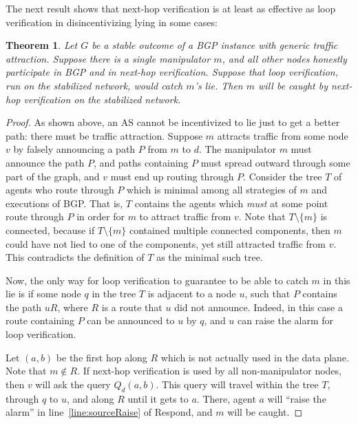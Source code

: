 \documentclass[10pt]{article}
\newtheorem{theorem}{Theorem}
\begin{document}
  The next result shows that next-hop verification is at least as
  effective as loop verification in disincentivizing lying in some cases:
  \begin{theorem}
    Let $G$ be a stable outcome of a BGP instance with generic traffic attraction.
    Suppose there is a single manipulator $m$,
    and all other nodes honestly participate in BGP and in next-hop verification.
    Suppose that loop verification, run on the stabilized network,
    would catch $m$'s lie.
    Then $m$ will be caught by next-hop verification on the stabilized network.
  \end{theorem}
  \begin{proof}
    As shown above, an AS cannot be incentivized to lie just to get a better
    path: there must be traffic attraction.
    Suppose $m$ attracts traffic from some node $v$ by falsely announcing a path
    $P$ from $m$ to $d$.
    The manipulator $m$ must announce the path $P$, and paths containing $P$
    must spread outward through some part of the graph, and $v$ must end up
    routing through $P$.
    Consider the tree $T$ of agents who route through $P$ which is minimal among all
    strategies of $m$ and executions of BGP.
    That is, $T$ contains the agents which \emph{must} at some point route
    through $P$ in order for $m$ to attract traffic from $v$.
    Note that $T\setminus \{m\}$ is connected, because if $T\setminus \{m\}$
    contained multiple connected components, then $m$ could have not lied to one
    of the components, yet still attracted traffic from $v$.
    This contradicts the definition of $T$ as the minimal such tree.


    Now, the only way for loop verification to guarantee to be able to
    catch $m$ in this lie is if some
    node $q$ in the tree $T$ is adjacent to a node $u$, such that $P$ contains
    the path $uR$, where $R$ is a route that $u$ did not announce.
    Indeed, in this case a route containing $P$ can be announced to $u$ by $q$,
    and $u$ can raise the alarm for loop verification.

    Let $(a,b)$ be the first hop along $R$ which is not actually used in the
    data plane. Note that $m\notin R$.
    If next-hop verification is used by all non-manipulator nodes, then $v$ will
    ask the query $Q_d(a,b)$. This query will travel within the tree $T$,
    through $q$ to $u$, and along $R$ until it gets to $a$.
    There, agent $a$ will ``raise the alarm'' in line~\ref{line:sourceRaise} of {\sc
    Respond}, and $m$ will be caught.
  \end{proof}
\end{document}
